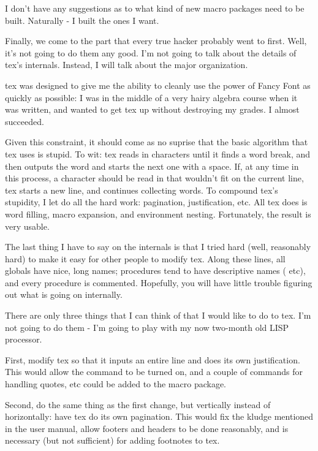 I don't have any suggestions as to what kind of new macro
packages need to be built. Naturally - I built the ones I want.


Finally, we come to the part that every true hacker probably went
to first. Well, it's not going to do them any good. I'm not going
to talk about the details of tex's internals. Instead, I will talk
about the major organization.

tex was designed to give me the ability to cleanly use the power
of {\FF Fancy Font} as quickly as possible: I was in the middle
of a very hairy algebra course when it was written, and wanted to
get tex up without destroying my grades. I almost succeeded.


Given this constraint, it should come as no suprise that the
basic algorithm that tex uses is stupid. To wit: tex reads in
characters until it finds a word break, and then outputs the word
and starts the next one with a space. If, at any time in this
process, a character should be read in that wouldn't fit on the
current line, tex starts a new line, and continues collecting
words. To compound tex's stupidity, I let  do all the
hard work: pagination, justification, etc. All tex does is word
filling, macro expansion, and environment nesting. Fortunately,
the result is very usable.

The last thing I have to say on the internals is that I tried
hard (well, reasonably hard) to make it easy for other people to
modify tex. Along these lines, all globals have nice, long names;
procedures tend to have descriptive names (
etc), and every procedure is commented. Hopefully, you will have
little trouble figuring out what is going on internally.


There are only three things that I can think of that I would like
to do to tex. I'm not going to do them - I'm going to play with
my now two-month old LISP processor.

First, modify tex so that it inputs an entire line and does its
own justification. This would allow the  command to be
turned on, and a couple of commands for handling quotes, etc
could be added to the  macro package.

Second, do the same thing as the first change, but vertically
instead of horizontally: have tex do its own pagination. This
would fix the  kludge mentioned in the user manual,
allow footers and headers to be done reasonably, and is necessary
(but not sufficient) for adding footnotes to tex.

